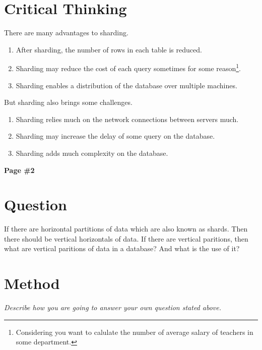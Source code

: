 \documentclass[12pt, a4paper]{article}
\begin{document}
\section{Critical Thinking}

There are many advantages to sharding.

\begin{enumerate}[1.]\setlength{\itemsep}{-0.1cm}\setlength{\topsep}{0pt}
\item After sharding, the number of rows in each table is reduced.
\item Sharding may reduce the cost of each query sometimes for some reason\footnote{Considering you want to calulate the number of average salary of teachers in some department.}.
\item Sharding enables a distribution of the database over multiple machines.
\end{enumerate}

But sharding also brings some challenges.

\begin{enumerate}[1.]\setlength{\itemsep}{-0.1cm}\setlength{\topsep}{0pt}
\item Sharding relies much on the network connections between servers much.
\item Sharding may increase the delay of some query on the database.
\item Sharding adds much complexity on the database.
\end{enumerate}

\newpage

\begin{center}
{\textbf{
Page \#2}}
\end{center}

\section{Question}

If there are horizontal partitions of data which are also known as shards. Then there should be vertical horizontals of data. If there are vertical paritions, then what are vertical paritions of data in a database? And what is the use of it?

\section{Method}

{\emph{Describe how you are going to answer your own question stated above.}}
\end{document}
